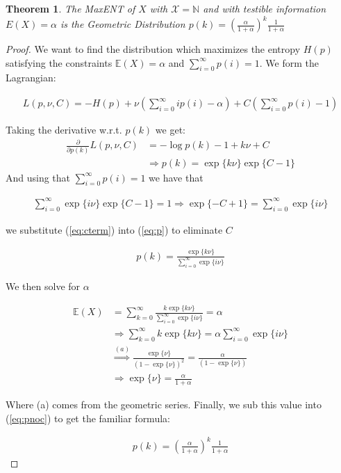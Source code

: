 \documentclass[]{article}
\theoremstyle{mattstyle}
\newtheorem{theorem}{Theorem}[section]
\theoremstyle{definition}
\begin{document}
\begin{theorem}
	The MaxENT of $X$ with $\mathcal{X} = \mathbb{N}$ and with testible information $E(X)=\alpha$ is the Geometric Distribution $p(k)=\left(\frac{\alpha}{1+\alpha}\right)^k \frac{1}{1+\alpha}$
\end{theorem}

\begin{proof}
	We want to find the distribution which maximizes the entropy $H(p)$ satisfying the constraints $\mathbb{E}(X)=\alpha$ and $\sum_{i=0}^{\infty}p(i)=1$. We form the Lagrangian:
	
	\begin{align*}
	L(p,\nu, C)=-H(p)+\nu \left(\sum_{i=0}^{\infty} ip(i)-\alpha\right) + C\left( \sum_{i=0}^{\infty}p(i)-1 \right)
	\end{align*}
	
	Taking the derivative w.r.t. $p(k)$ we get:
	\begin{align}\label{eq:p}
	\frac{\partial}{\partial p(k)}L(p,\nu, C)&= -\log p(k) - 1 + k\nu + C\\
	&\Rightarrow p(k) = \exp\{k\nu\}\exp\{C-1\}
	\end{align}
	And using that $\sum_{i=0}^{\infty}p(i)=1$ we have that
	
	\begin{align}\label{eq:cterm}
	\sum_{i=0}^{\infty}\exp\{i\nu\}\exp\{C-1\}
	= 1 \Rightarrow \exp\{-C+1\} = \sum_{i=0}^{\infty}\exp\{i\nu\}
	\end{align}
	
	we substitute (\ref{eq:cterm}) into (\ref{eq:p}) to eliminate $C$
	
	\begin{align}\label{eq:pnoc}
	p(k)=\frac{\exp\{k\nu\}}{\sum_{i=0}^{\infty}\exp\{i\nu\}}
	\end{align}
	
	We then solve for $\alpha$
	
	\begin{align*}
	\mathbb{E}(X)&=\sum_{k=0}^{\infty}\frac{k\exp\{k\nu\}}{\sum_{i=0}^{\infty}\exp\{i\nu\}}=\alpha\\
	&\Rightarrow \sum_{k=0}^{\infty}k\exp\{k\nu\}=\alpha\sum_{i=0}^{\infty}\exp\{i\nu\}\\
	&\overset{(a)}{\Rightarrow} \frac{\exp\{\nu\}}{(1-\exp\{\nu\})^2} = \frac{\alpha}{(1-\exp\{\nu\})}\\
	&\Rightarrow \exp\{\nu\} = \frac{\alpha}{1+\alpha}
	\end{align*}
	
	Where (a) comes from the geometric series. Finally, we sub this value into (\ref{eq:pnoc}) to get the familiar formula:
	
	\begin{align}
	p(k)=\left(\frac{\alpha}{1+\alpha}\right)^k\frac{1}{1+\alpha}
	\end{align}
\end{proof}
\end{document}
